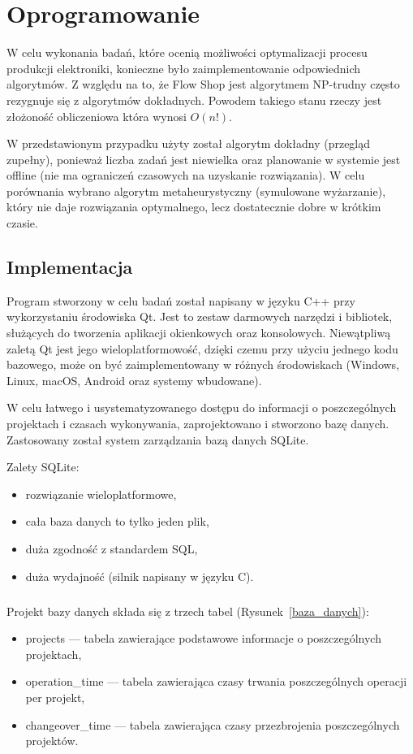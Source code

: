\chapter{Oprogramowanie}

W celu wykonania badań, które ocenią możliwości optymalizacji procesu produkcji elektroniki, konieczne było zaimplementowanie odpowiednich algorytmów.
Z względu na to, że Flow Shop jest algorytmem NP-trudny często rezygnuje się z algorytmów dokładnych. Powodem takiego stanu rzeczy jest złożoność obliczeniowa która wynosi $O(n!)$.

W przedstawionym przypadku użyty został algorytm dokładny (przegląd zupełny), ponieważ liczba zadań jest niewielka oraz planowanie w systemie jest offline (nie ma ograniczeń czasowych na uzyskanie rozwiązania).
W celu porównania wybrano algorytm metaheurystyczny (symulowane wyżarzanie), który nie daje rozwiązania optymalnego, lecz dostatecznie dobre w krótkim czasie.

\section{Implementacja}
Program stworzony w celu badań został napisany w języku C++ przy wykorzystaniu środowiska Qt. Jest to zestaw darmowych narzędzi i bibliotek, służących do tworzenia aplikacji okienkowych oraz konsolowych. Niewątpliwą zaletą Qt jest jego wieloplatformowość, dzięki czemu przy użyciu jednego kodu bazowego, może on być zaimplementowany w różnych środowiskach (Windows, Linux, macOS, Android oraz systemy wbudowane).

\breakparagraph{}
W celu łatwego i usystematyzowanego dostępu do informacji o poszczególnych projektach i czasach wykonywania, zaprojektowano i stworzono bazę danych. Zastosowany został system zarządzania bazą danych SQLite.

\breakparagraph{}
Zalety SQLite:
\begin{itemize}
	\item rozwiązanie wieloplatformowe,
	\item cała baza danych to tylko jeden plik,
	\item duża zgodność z standardem SQL,
	\item duża wydajność (silnik napisany w języku C).
\end{itemize}

\newpage{}
\paragraph{}
Projekt bazy danych składa się z trzech tabel (Rysunek~\ref{baza_danych}):
\begin{itemize}
	\item projects --- tabela zawierające podstawowe informacje o poszczególnych projektach,
	\item operation\_time --- tabela zawierająca czasy trwania poszczególnych operacji per projekt,
	\item changeover\_time --- tabela zawierająca czasy przezbrojenia poszczególnych projektów.
\end{itemize}

